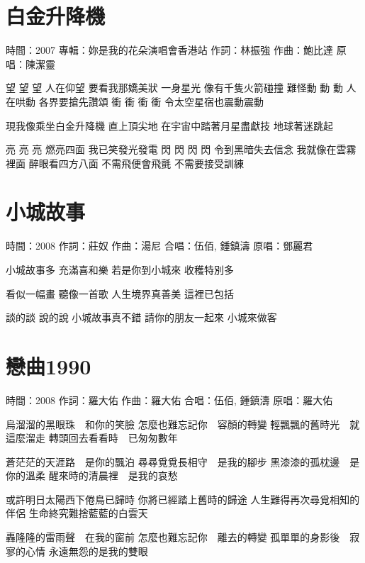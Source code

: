 \documentclass[UTF8,a4paper,oneside,twocolumn,12pt]{ctexbook}
\newcommand{\infopair}[2]{\textbullet #1：#2}
\newcommand{\zc}[1][伍佰]{\infopair{作詞}{#1}}
\newcommand{\zq}[1][伍佰]{\infopair{作曲}{#1}}
\newcommand{\zj}[1]{\infopair{專輯}{#1}}
\newcommand{\yc}[1]{\infopair{原唱}{#1}}
\newcommand{\sj}[1]{\infopair{時間}{#1}}
\newenvironment{info}{\begin{flushleft}\kaishu
	}
	{\end{flushleft}\normalsize\yahei\par}
\newenvironment{lyric}{
	}
{}
\begin{document}
\section{白金升降機}%
\begin{info}
	\sj{2007}
	\zj{妳是我的花朵演唱會香港站}
	\zc[林振強]
	\zq[鮑比達]
	\yc{陳潔靈}
\end{info}
\begin{lyric}
	望 望 望 人在仰望 要看我那嬌美狀
	一身星光 像有千隻火箭碰撞
	難怪動 動 動 人在哄動 各界要搶先讚頌
	衝 衝 衝 衝 令太空星宿也震動震動

	現我像乘坐白金升降機 直上頂尖地
	在宇宙中踏著月星盡獻技 地球著迷跳起

	亮 亮 亮 燃亮四面 我已笑發光發電
	閃 閃 閃 閃 令到黑暗失去信念
	我就像在雲霧裡面 醉眼看四方八面
	不需飛便會飛氈 不需要接受訓練
\end{lyric}

\section{小城故事}
\begin{info}
	\sj{2008}
	\zc[莊奴]
	\zq[湯尼]
	\infopair{合唱}{伍佰, 鍾鎮濤}
	\yc{鄧麗君}
\end{info}
\begin{lyric}
	小城故事多
	充滿喜和樂
	若是你到小城來
	收穫特別多

	看似一幅畫
	聽像一首歌
	人生境界真善美
	這裡已包括

	談的談 說的說
	小城故事真不錯
	請你的朋友一起來
	小城來做客
\end{lyric}

\section{戀曲1990}
\begin{info}
	\sj{2008}
	\zc[羅大佑]
	\zq[羅大佑]
	\infopair{合唱}{伍佰, 鍾鎮濤}
	\yc{羅大佑}
\end{info}
\begin{lyric}
	烏溜溜的黑眼珠　和你的笑臉
	怎麼也難忘記你　容顏的轉變
	輕飄飄的舊時光　就這麼溜走
	轉頭回去看看時　已匆匆數年

	蒼茫茫的天涯路　是你的飄泊
	尋尋覓覓長相守　是我的腳步
	黑漆漆的孤枕邊　是你的溫柔
	醒來時的清晨裡　是我的哀愁

	或許明日太陽西下倦鳥已歸時
	你將已經踏上舊時的歸途
	人生難得再次尋覓相知的伴侶
	生命終究難捨藍藍的白雲天

	轟隆隆的雷雨聲　在我的窗前
	怎麼也難忘記你　離去的轉變
	孤單單的身影後　寂寥的心情
	永遠無怨的是我的雙眼
\end{lyric}
\end{document}
